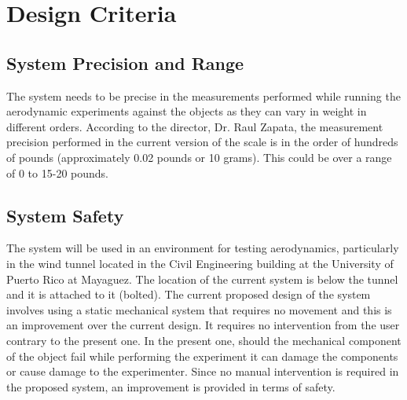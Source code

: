 \section{Design Criteria}
	
	\subsection{System Precision and Range}

    	The system needs to be precise in the measurements performed while running the aerodynamic experiments against the objects as they can vary in weight in different orders. According to the director, Dr. Raul Zapata, the measurement precision performed in the current version of the scale is in the order of hundreds of pounds (approximately 0.02 pounds or 10 grams). This could be over a range of 0 to 15-20 pounds.

	\subsection{System Safety}

   		The system will be used in an environment for testing aerodynamics, particularly in the wind tunnel located in the Civil Engineering building at the University of Puerto Rico at Mayaguez. The location of the current system is below the tunnel and it is attached to it (bolted). The current proposed design of the system involves using a static mechanical system that requires no movement and this is an improvement over the current design. It requires no intervention from the user contrary to the present one. In the present one, should the mechanical component of the object fail while performing the experiment it can damage the components or cause damage to the experimenter. Since no manual intervention is required in the proposed system, an improvement is provided in terms of safety.
   	
